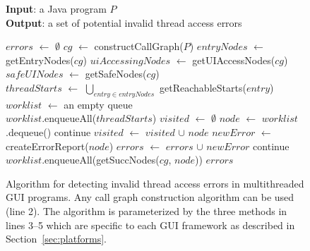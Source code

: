 \begin{figure}[t]
\textbf{Input}: a Java program $\mathit{P}$\\
\textbf{Output}: a set of potential invalid thread access errors\\
\vspace{-4mm}
\begin{algorithmic}[1]
\STATE $\mathit{errors}$ $\leftarrow$ $\emptyset$ 
\STATE $\mathit{cg}$ $\leftarrow$ constructCallGraph($\mathit{P}$)
\STATE $\mathit{entryNodes}$ $\leftarrow$ getEntryNodes($\mathit{cg}$)
\STATE $\mathit{uiAccessingNodes}$ $\leftarrow$ getUIAccessNodes($\mathit{cg}$)
\STATE $\mathit{safeUINodes}$ $\leftarrow$ getSafeNodes($\mathit{cg}$)\\
\STATE $\mathit{threadStarts}$ $\leftarrow$ $\bigcup_{entry \in entryNodes}$ getReachableStarts($\mathit{entry}$)
\STATE $\mathit{worklist}$ $\leftarrow$ an empty queue\\
\STATE $\mathit{worklist}$.enqueueAll($\mathit{threadStarts}$)
\STATE $\mathit{visited}$ $\leftarrow$ $\emptyset$
\STATE $\mathit{node}$ $\leftarrow$ $\mathit{worklist}$.dequeue()
\STATE continue
\ENDIF
\STATE $\mathit{visited}$ $\leftarrow$ $\mathit{visited}$ $\cup$ $\mathit{node}$
\STATE $\mathit{newError}$ $\leftarrow$ createErrorReport($\mathit{node}$)
\STATE $\mathit{errors}$ $\leftarrow$ $\mathit{errors}$ $\cup$ $\mathit{newError}$
\STATE continue
\ELSE
\STATE $\mathit{worklist}$.enqueueAll(getSuccNodes($\mathit{cg}$, $\mathit{node}$))
\ENDIF 
\ENDWHILE
\RETURN $errors$
\vspace{-2mm}
\end{algorithmic}
\caption{Algorithm for detecting invalid thread access errors in multithreaded GUI programs. 
Any call graph construction algorithm can be used (line 2). The algorithm
is parameterized by the three methods in lines 3--5 which are specific to each GUI framework
 as described in Section~\ref{sec:platforms}.
} \label{fig:detectalgorithm}
\end{figure}

